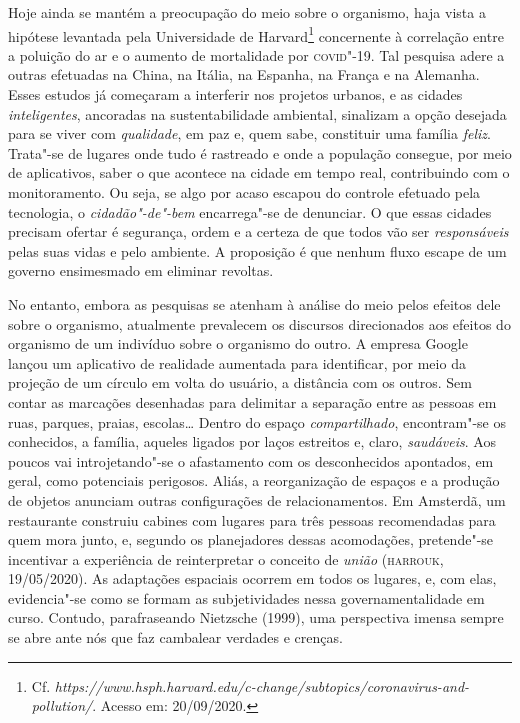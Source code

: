 Hoje ainda se mantém a preocupação do meio sobre o organismo, haja vista
a hipótese levantada pela Universidade de Harvard\footnote{Cf.
  \emph{https://www.hsph.harvard.edu/c-change/subtopics/coronavirus-and-pollution/}.
  Acesso em: 20/09/2020.} concernente à correlação entre a poluição do
ar e o aumento de mortalidade por \textsc{covid}"-19. Tal pesquisa adere a outras
efetuadas na China, na Itália, na Espanha, na França e na Alemanha.
Esses estudos já começaram a interferir nos projetos urbanos, e as
cidades \emph{inteligentes}, ancoradas na sustentabilidade ambiental,
sinalizam a opção desejada para se viver com \emph{qualidade}, em paz e,
quem sabe, constituir uma família \emph{feliz}. Trata"-se de lugares onde
tudo é rastreado e onde a população consegue, por meio de aplicativos,
saber o que acontece na cidade em tempo real, contribuindo com o
monitoramento. Ou seja, se algo por acaso escapou do controle efetuado
pela tecnologia, o \emph{cidadão"-de"-bem} encarrega"-se de denunciar. O
que essas cidades precisam ofertar é segurança, ordem e a certeza de que
todos vão ser \emph{responsáveis} pelas suas vidas e pelo ambiente. A
proposição é que nenhum fluxo escape de um governo ensimesmado em
eliminar revoltas.

No entanto, embora as pesquisas se atenham à análise do meio pelos
efeitos dele sobre o organismo, atualmente prevalecem os discursos
direcionados aos efeitos do organismo de um indivíduo sobre o organismo
do outro. A empresa Google lançou um aplicativo de realidade aumentada
para identificar, por meio da projeção de um círculo em volta do
usuário, a distância com os outros. Sem contar as marcações desenhadas
para delimitar a separação entre as pessoas em ruas, parques, praias,
escolas\ldots{} Dentro do espaço \emph{compartilhado}, encontram"-se os
conhecidos, a família, aqueles ligados por laços estreitos e, claro,
\emph{saudáveis}. Aos poucos vai introjetando"-se o afastamento com os
desconhecidos apontados, em geral, como potenciais perigosos. Aliás, a
reorganização de espaços e a produção de objetos anunciam outras
configurações de relacionamentos. Em Amsterdã, um restaurante construiu
cabines com lugares para três pessoas recomendadas para quem mora junto,
e, segundo os planejadores dessas acomodações, pretende"-se incentivar a
experiência de reinterpretar o conceito de \emph{união} (\textsc{harrouk},
19/05/2020). As adaptações espaciais ocorrem em todos os lugares, e, com
elas, evidencia"-se como se formam as subjetividades nessa
governamentalidade em curso. Contudo, parafraseando Nietzsche (1999),
uma perspectiva imensa sempre se abre ante nós que faz cambalear
verdades e crenças.


